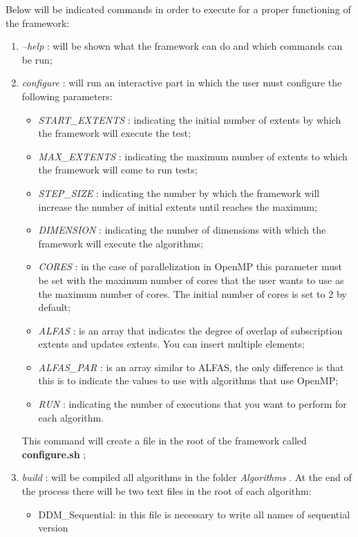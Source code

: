 \documentclass[a4paper,11pt]{report}
\newcommand{\folder}[1]{
  \textcolor{foldercolor}{\textit{#1}}
}
\newcommand{\command}[1]{
  \textcolor{commandcolor}{\textit{#1}}
}
\newcommand{\bashvariable}[1]{
  \textcolor{bashvariable}{\textit{#1}}
}
\newcommand{\bashfile}[1]{
  \textcolor{bashfilecolor}{\textbf{#1}}
}
\begin{document}
 Below will be indicated commands in order to execute for a proper functioning of the framework:
 \begin{enumerate}
  \item \command{--help}: will be shown what the framework can do and which commands can be run;
  \item \command{configure}: will run an interactive part in which the user must configure the following 
  parameters:
  \begin{itemize}
   \item \bashvariable{START\_EXTENTS}: indicating the initial number of extents by which the 
   framework will execute the test;
   \item \bashvariable{MAX\_EXTENTS}: indicating the maximum number of extents to which the 
   framework will come to run tests;
   \item \bashvariable{STEP\_SIZE}: indicating the number by which the framework will increase 
   the number of initial extents until reaches the maximum;
   \item \bashvariable{DIMENSION}: indicating the number of dimensions with which the framework 
   will execute the algorithms;
   \item \bashvariable{CORES}: in the case of parallelization in OpenMP this parameter must 
   be set with the maximum number of cores that the user wants to use as the maximum number of cores. 
   The initial number of cores is set to 2 by default;
   \item \bashvariable{ALFAS}: is an array that indicates the degree of overlap of subscription extents 
   and updates extents. You can insert multiple elements;
   \item \bashvariable{ALFAS\_PAR}: is an array similar to ALFAS, the only difference is that 
   this is to indicate the values to use with algorithms that use OpenMP;
   \item \bashvariable{RUN}: indicating the number of executions that you want to perform for each algorithm.
  \end{itemize}
  This command will create a file in the root of the framework called \bashfile{configure.sh};
  \item \command{build}: will be compiled all algorithms in the folder \folder{Algorithms}.
  At the end of the process there will be two text files in the root of each algorithm:
  \begin{itemize}
   \item DDM\_Sequential: in this file is necessary to write all names of sequential version 

\end{itemize}
\end{enumerate}
\end{document}
